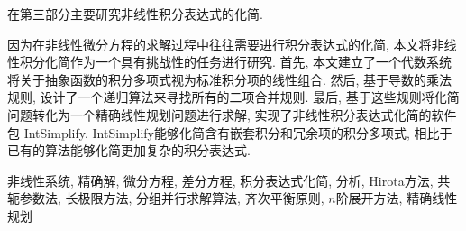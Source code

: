 在第三部分主要研究非线性积分表达式的化简.

因为在非线性微分方程的求解过程中往往需要进行积分表达式的化简, 本文将非线性积分化简作为一个具有挑战性的任务进行研究. 首先, 本文建立了一个代数系统将关于抽象函数的积分多项式视为标准积分项的线性组合. 然后, 基于导数的乘法规则, 设计了一个递归算法来寻找所有的二项合并规则. 最后, 基于这些规则将化简问题转化为一个精确线性规划问题进行求解, 实现了非线性积分表达式化简的软件包 IntSimplify.  IntSimplify能够化简含有嵌套积分和冗余项的积分多项式, 相比于已有的算法能够化简更加复杂的积分表达式. 

\bigskip

非线性系统, 精确解, 微分方程, 差分方程, 积分表达式化简, \Painleve{}分析, Hirota方法, 共轭参数法, 长极限方法, 分组并行求解算法, 齐次平衡原则, $n$阶展开方法, 精确线性规划
